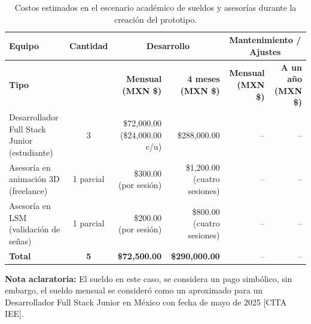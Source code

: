 \begin{table}[H]
	\centering
	\renewcommand{\arraystretch}{1.6}
	\setlength{\tabcolsep}{10pt}
	\Huge
	\begin{adjustbox}{max width=\textwidth}
		\begin{tabular}{|p{5.5cm}|c|r|r|r|r|}
			\hline
			\textbf{Equipo} & \textbf{Cantidad} & \multicolumn{2}{c|}{\textbf{Desarrollo}} & \multicolumn{2}{c|}{\textbf{Mantenimiento / Ajustes}} \\ \hline
			\textbf{Tipo} & & \textbf{Mensual (MXN \$)} & \textbf{4 meses (MXN \$)} & \textbf{Mensual (MXN \$)} & \textbf{A un año (MXN \$)} \\ \hline
			Desarrollador Full Stack Junior (estudiante) & 3 & \$72,000.00 (\$24,000.00 c/u) & \$288,000.00 & -- & -- \\ \hline
			Asesoría en animación 3D (freelance) & 1 parcial & \$300.00 (por sesión) & \$1,200.00 (cuatro sesiones) & -- & -- \\ \hline
			Asesoría en LSM (validación de señas) & 1 parcial & \$200.00 (por sesión) & \$800.00 (cuatro sesiones) & -- & -- \\ \hline
			\textbf{Total} & \textbf{5} & \textbf{\$72,500.00} & \textbf{\$290,000.00} & -- & -- \\ \hline
		\end{tabular}
	\end{adjustbox}
	\caption{Costos estimados en el escenario académico de sueldos y asesorías durante la creación del prototipo.}
	\label{tab:sueldos_asesorias}
\end{table}


\noindent \textbf{Nota aclaratoria:}  
El sueldo en este caso, se considera un pago simbólico, sin embargo, el sueldo mensual se consideró como un aproximado para un Desarrollador Full Stack Junior en México con fecha de mayo de 2025 [CITA IEE].  

